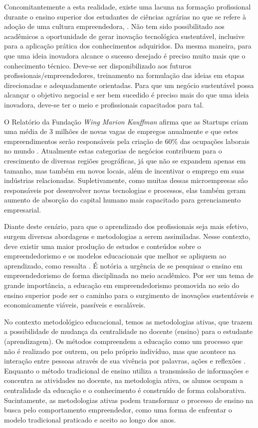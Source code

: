 Concomitantemente a esta realidade, existe uma lacuna na formação profissional durante o ensino superior dos estudantes de ciências agrárias no que se refere à adoção de uma cultura empreendedora, \cite{araujo_educacao_2019}. Não tem sido possibilitado aos acadêmicos a oportunidade de gerar inovação tecnológica sustentável, inclusive para a aplicação prática dos conhecimentos adquiridos. Da mesma maneira, para que uma ideia inovadora alcance o sucesso desejado é preciso muito mais que o conhecimento técnico. Deve-se ser disponibilizado aos futuros profissionais/empreendedores, treinamento na formulação das ideias em etapas direcionadas e adequadamente orientadas. Para que um negócio sustentável possa alcançar o objetivo negocial e ser bem sucedido é preciso mais do que uma ideia inovadora, deve-se ter o meio e profissionais capacitados para tal. 


O Relatório da Fundação \textit{Wing Marion Kauffman} afirma que as Startups criam uma média de 3 milhões de novas vagas de empregos anualmente e que estes empreendimentos serão responsáveis pela criação de 60\% das ocupações laborais no mundo \cite{brasil_neto_resistencia_2017}. Atualmente estas categorias de negócios contribuem para o crescimento de diversas regiões geográficas, já que não se expandem apenas em tamanho, mas também em novos locais, além de incentivar o emprego em suas indústrias relacionadas. Supletivamente, como muitas dessas microempresas são responsáveis por desenvolver novas tecnologias e processos, elas também geram aumento de absorção do capital humano mais capacitado para gerenciamento empresarial.


Diante deste cenário, para que o aprendizado dos profissionais seja mais efetivo, surgem diversas abordagens e metodologias a serem assimiladas. Nesse contexto, deve existir uma maior produção de estudos e conteúdos sobre o empreendedorismo e os modelos educacionais que melhor se apliquem ao aprendizado, como ressalta . É notória a urgência de se pesquisar o ensino em empreendedorismo de forma disciplinada no meio acadêmico. Por ser um tema de grande importância, a educação em empreendedorismo promovida no seio do ensino superior pode ser o caminho para o surgimento de inovações sustentáveis e economicamente viáveis, passíveis e escaláveis.

No contexto metodológico educacional, temos as metodologias ativas, que trazem a possibilidade de mudança da centralidade no docente (ensino) para o estudante (aprendizagem). Os métodos compreendem a educação como um processo que não é realizado por outrem, ou pelo próprio indivíduo, mas que acontece na interação entre pessoas através de sua vivência por palavras, ações e reflexões \cite{paiva_metodologias_2016}. Enquanto o método tradicional de ensino utiliza a transmissão de informações e concentra as atividades no docente, na metodologia ativa, os alunos ocupam a centralidade da educação e o conhecimento é construído de forma colaborativa. Sucintamente, as metodologias ativas podem transformar o processo de ensino na busca pelo comportamento empreendedor, como uma forma de enfrentar o modelo tradicional praticado e aceito ao longo dos anos.
 
